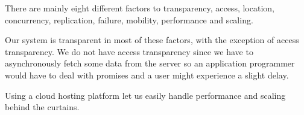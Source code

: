 There are mainly eight different factors to transparency, access, location, concurrency, replication, failure, mobility, performance and scaling. 

Our system is transparent in most of these factors, with the exception of access transparency.
We do not have access transparency since we have to asynchronously fetch some data from the server so an application programmer would have to deal with promises and a user might experience a slight delay.

Using a cloud hosting platform let us easily handle performance and scaling behind the curtains.




